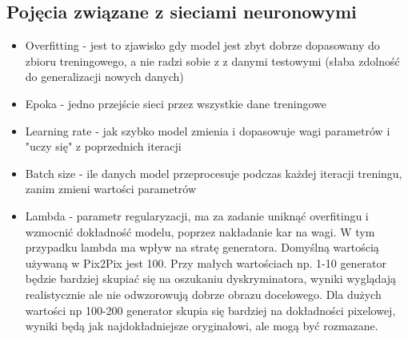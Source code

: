 \documentclass[12pt]{article}
\begin{document}
\begin{sloppypar}
{  \subsection{Pojęcia związane z sieciami neuronowymi}
  {
    \begin{itemize}
      \item Overfitting - jest to zjawisko gdy model jest zbyt dobrze dopasowany do zbioru treningowego, a nie radzi sobie z z danymi testowymi (słaba zdolność do generalizacji nowych danych) \cite{overfit}
      \item Epoka - jedno przejście sieci przez wszystkie dane treningowe
      \item Learning rate - jak szybko model zmienia i dopasowuje wagi parametrów i "uczy się" z poprzednich iteracji
      \item Batch size - ile danych model przeprocesuje podczas każdej iteracji treningu, zanim zmieni wartości parametrów
      \item Lambda - parametr regularyzacji, ma za zadanie uniknąć overfitingu i wzmocnić dokładność modelu, poprzez nakładanie kar na wagi. 
      W tym przypadku lambda ma wpływ na stratę generatora. Domyślną wartością używaną w Pix2Pix jest 100. Przy małych wartościach np. 1-10 generator będzie bardziej skupiać się na oszukaniu dyskryminatora, wyniki wyglądają realistycznie ale nie odwzorowują dobrze obrazu docelowego. 
      Dla dużych wartości np 100-200 generator skupia się bardziej na dokładności pixelowej, wyniki będą jak najdokładniejsze oryginałowi, ale mogą być rozmazane.
    \end{itemize}
  }
}
\end{sloppypar}
\end{document}

